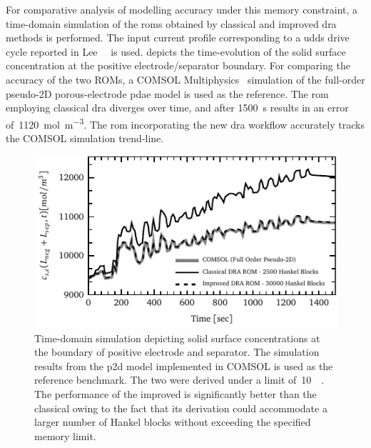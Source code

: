 For comparative analysis  of modelling accuracy under this  memory constraint, a
time-domain simulation  of the  \glspl{rom} obtained  by classical  and improved
\gls{dra}  methods is  performed.  The input  current  profile corresponding  to
a  \gls{udds}  drive  cycle  reported in  Lee~\etal{}~\cite{Lee2012a}  is  used.
  depicts  the  time-evolution of  the  solid  surface
concentration  at  the  positive  electrode/separator  boundary.  For  comparing
the  accuracy   of  the   two  ROMs,  a   COMSOL  Multiphysics~\cite{COMSOL2012}
simulation  of  the  full-order   pseudo-2D  porous-electrode  \gls{pdae}  model
is  used  as   the  reference.  The  \gls{rom}   employing  classical  \gls{dra}
diverges  over   time,  and  after   \SI{1500}{\second}  results  in   an  error
of~\SI{1120}{\mole\per\meter\cubed}.   The  \gls{rom}  incorporating   the  new
\gls{dra}  workflow   accurately  tracks   the  COMSOL   simulation  trend-line.

\begin{figure}[!htbp]
    \centering
    \includegraphics{comsol_comparison.pdf}
    \caption[%
    Solid surface concentrations at positive electrode/separator interface
    ]%
    {%
        Time-domain  simulation depicting  solid surface  concentrations at  the
        boundary  of positive  electrode and  separator. The  simulation results
        from  the  \gls{p2d}  model  implemented   in  COMSOL  is  used  as  the
        reference  benchmark. The  two    were derived  under
        a    limit   of~\SI{10}{\giga\byte}.  The  performance
        of  the  improved   is  significantly  better than  the
        classical  owing to the  fact that its derivation could
        accommodate  a larger  number  of Hankel  blocks  without exceeding  the
        specified memory limit.
    }%
    \label{fig:time_domain_sim}
\end{figure}


